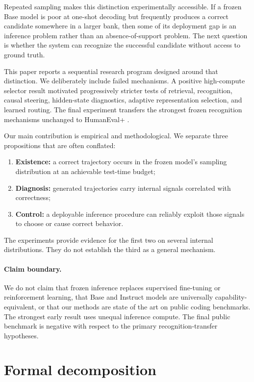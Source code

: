 \documentclass[11pt]{article}
\begin{document}
Repeated sampling makes this distinction experimentally accessible. If a frozen Base model is poor at one-shot decoding but frequently produces a correct candidate somewhere in a larger bank, then some of its deployment gap is an inference problem rather than an absence-of-support problem. The next question is whether the system can recognize the successful candidate without access to ground truth.

This paper reports a sequential research program designed around that distinction. We deliberately include failed mechanisms. A positive high-compute selector result motivated progressively stricter tests of retrieval, recognition, causal steering, hidden-state diagnostics, adaptive representation selection, and learned routing. The final experiment transfers the strongest frozen recognition mechanisms unchanged to HumanEval+ \cite{liu2023evalplus}.

Our main contribution is empirical and methodological. We separate three propositions that are often conflated:

\begin{enumerate}
    \item \textbf{Existence:} a correct trajectory occurs in the frozen model's sampling distribution at an achievable test-time budget;
    \item \textbf{Diagnosis:} generated trajectories carry internal signals correlated with correctness;
    \item \textbf{Control:} a deployable inference procedure can reliably exploit those signals to choose or cause correct behavior.
\end{enumerate}

The experiments provide evidence for the first two on several internal distributions. They do not establish the third as a general mechanism.

\paragraph{Claim boundary.}
We do not claim that frozen inference replaces supervised fine-tuning or reinforcement learning, that Base and Instruct models are universally capability-equivalent, or that our methods are state of the art on public coding benchmarks. The strongest early result uses unequal inference compute. The final public benchmark is negative with respect to the primary recognition-transfer hypotheses.

\section{Formal decomposition}
\end{document}
